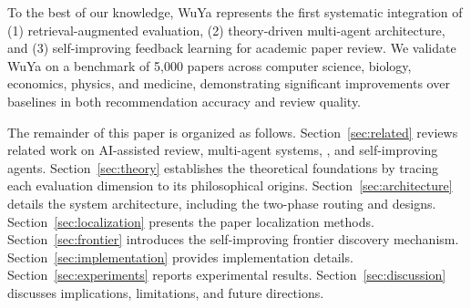 To the best of our knowledge, WuYa represents the first systematic integration of (1) retrieval-augmented evaluation, (2) theory-driven multi-agent architecture, and (3) self-improving feedback learning for academic paper review. We validate WuYa on a benchmark of 5,000 papers across computer science, biology, economics, physics, and medicine, demonstrating significant improvements over baselines in both recommendation accuracy and review quality.

The remainder of this paper is organized as follows. Section~\ref{sec:related} reviews related work on AI-assisted review, multi-agent systems, \rag{}, and self-improving agents. Section~\ref{sec:theory} establishes the theoretical foundations by tracing each evaluation dimension to its philosophical origins. Section~\ref{sec:architecture} details the system architecture, including the two-phase routing and \subagent{} designs. Section~\ref{sec:localization} presents the paper localization methods. Section~\ref{sec:frontier} introduces the self-improving frontier discovery mechanism. Section~\ref{sec:implementation} provides implementation details. Section~\ref{sec:experiments} reports experimental results. Section~\ref{sec:discussion} discusses implications, limitations, and future directions.
